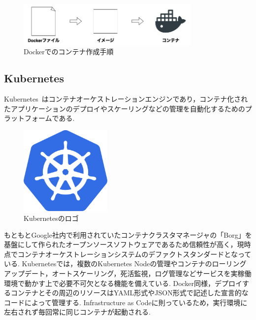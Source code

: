 \begin{figure}[htbp]
\begin{center}
    \includegraphics[width=0.8\textwidth]{./figures/docker-process.jpg}
    \caption{Dockerでのコンテナ作成手順}
\end{center}
\end{figure}

\subsection{Kubernetes}
\label{background:container-orchestration-system:kubernetes}

Kubernetes~\cite{Kubernetes}はコンテナオーケストレーションエンジンであり，コンテナ化されたアプリケーションのデプロイやスケーリングなどの管理を自動化するためのプラットフォームである.

\begin{figure}[htbp]
\begin{center}
    \includegraphics[width=0.4\textwidth]{./figures/kubernetes_logo.png}
    \caption{Kubernetesのロゴ}
\end{center}
\end{figure}

もともとGoogle社内で利用されていたコンテナクラスタマネージャの「Borg」を基盤にして作られたオープンソースソフトウェアであるため信頼性が高く，現時点でコンテナオーケストレーションシステムのデファクトスタンダードとなっている.
Kubernetesでは，複数のKubernetes Nodeの管理やコンテナのローリングアップデート，オートスケーリング，死活監視，ログ管理などサービスを実稼働環境で動かす上で必要不可欠となる機能を備えている.
Docker同様，デプロイするコンテナとその周辺のリソースはYAML形式やJSON形式で記述した宣言的なコードによって管理する.
Infrastructure as Codeに則っているため，実行環境に左右されず毎回常に同じコンテナが起動される.

